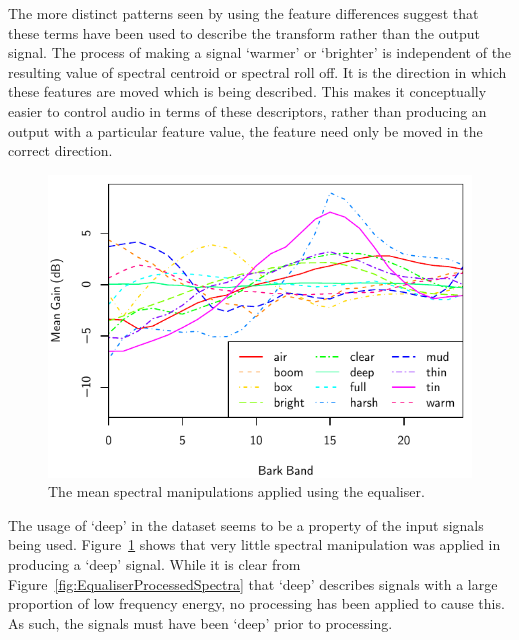 			The more distinct patterns seen by using the feature differences suggest that these terms have been
			used to describe the transform rather than the output signal. The process of making a signal
			`warmer' or `brighter' is independent of the resulting value of spectral centroid or spectral roll
			off. It is the direction in which these features are moved which is being described. This makes it
			conceptually easier to control audio in terms of these descriptors, rather than producing an output
			with a particular feature value, the feature need only be moved in the correct direction.

			\begin{figure}[h!]
				\centering
				\includegraphics{chapter4/Images/EqualiserDifferenceSpectra.pdf}
				\caption{The mean spectral manipulations applied using the equaliser.}
				\label{fig:EqualiserDifferenceSpectra}
			\end{figure}

			The usage of `deep' in the dataset seems to be a property of the input signals being used.
			Figure~\ref{fig:EqualiserDifferenceSpectra} shows that very little spectral manipulation was
			applied in producing a `deep' signal. While it is clear from
			Figure~\ref{fig:EqualiserProcessedSpectra} that `deep' describes signals with a large proportion of
			low frequency energy, no processing has been applied to cause this. As such, the signals must have
			been `deep' prior to processing.

